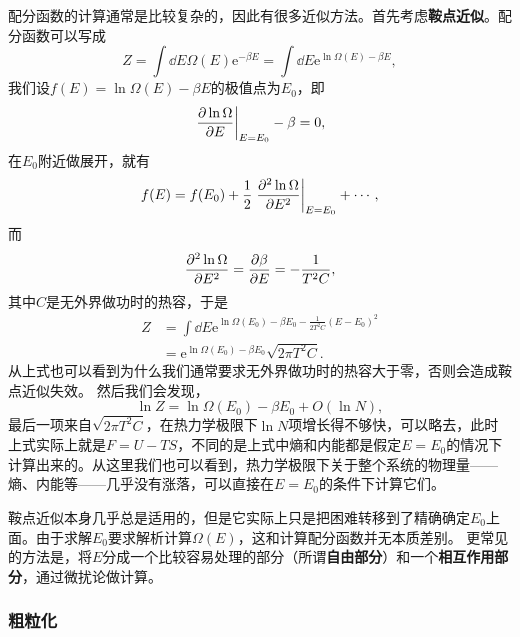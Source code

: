 \documentclass[hyperref, UTF8, a4paper]{ctexart}
\newcommand*{\ee}{\mathrm{e}}
\begin{document}
配分函数的计算通常是比较复杂的，因此有很多近似方法。首先考虑\textbf{鞍点近似}。配分函数可以写成
\[
    Z = \int \dd{E} \Omega(E) \ee^{- \beta E} = \int \dd{E} \ee^{\ln \Omega(E) - \beta E}, 
\]
我们设$f(E) = \ln \Omega(E) - \beta E$的极值点为$E_0$，即
\[
    \eval{\pdv{\ln \Omega}{E}}_{E=E_0} - \beta = 0,
\]
在$E_0$附近做展开，就有
\[
    f(E) = f(E_0) + \frac{1}{2} \eval{\pdv[2]{\ln \Omega}{E}}_{E=E_0} + \cdots,
\]
而
\[
    \pdv[2]{\ln \Omega}{E} = \pdv{\beta}{E} = - \frac{1}{T^2 C},
\]
其中$C$是无外界做功时的热容，于是
\[
    \begin{aligned}
        Z &= \int \dd{E} \ee^{\ln \Omega(E_0) - \beta E_0 - \frac{1}{2 T^2 C} (E - E_0)^2} \\
        &= \ee^{\ln \Omega(E_0) - \beta E_0} \sqrt{2\pi T^2 C}.
    \end{aligned}
\]
从上式也可以看到为什么我们通常要求无外界做功时的热容大于零，否则会造成鞍点近似失效。
然后我们会发现，
\[
    \ln Z = \ln \Omega(E_0) - \beta E_0  + O(\ln N),
\]
最后一项来自$\sqrt{2\pi T^2 C}$，在热力学极限下$\ln N$项增长得不够快，可以略去，此时上式实际上就是$F = U - TS$，不同的是上式中熵和内能都是假定$E=E_0$的情况下计算出来的。从这里我们也可以看到，热力学极限下关于整个系统的物理量——熵、内能等——几乎没有涨落，可以直接在$E=E_0$的条件下计算它们。

鞍点近似本身几乎总是适用的，但是它实际上只是把困难转移到了精确确定$E_0$上面。由于求解$E_0$要求解析计算$\Omega(E)$，这和计算配分函数并无本质差别。
更常见的方法是，将$E$分成一个比较容易处理的部分（所谓\textbf{自由部分}）和一个\textbf{相互作用部分}，通过微扰论做计算。

\subsubsection{粗粒化}\label{sec:coarse-graining}

\end{document}
